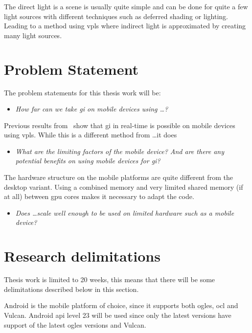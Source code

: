 \documentclass[a4paper, 12pt]{article}
\begin{document}
The direct light is a scene is usually quite simple and can be done for quite a few light sources with different techniques such as deferred shading or lighting. Leading to a method using \glspl{vpl} where indirect light is approximated by creating many light sources.


\section{Problem Statement}
\label{sec:Problem Statement}

The problem statements for this thesis work will be:

\begin{itemize}
  \item \textit{How far can we take \gls{gi} on mobile devices using \ldots?}
\end{itemize}

Previous results from~\cite{gimobile} show that \gls{gi} in real-time is possible on mobile devices using \glspl{vpl}. While this is a different method from \ldots it does

\begin{itemize}
  \item \textit{What are the limiting factors of the mobile device? And are there any potential benefits on using mobile devices for \gls{gi}?}
\end{itemize}

The hardware structure on the mobile platforms are quite different from the desktop variant. Using a combined memory and very limited shared memory (if at all) between \gls{gpu} cores makes it necessary to adapt the code.

\begin{itemize}
  \item \textit{Does \ldots scale well enough to be used on limited hardware such as a mobile device?}
\end{itemize}



\section{Research delimitations}
\label{sec:Research delimitations}

Thesis work is limited to 20 weeks, this means that there will be some delimitations described below in this section.

Android is the mobile platform of choice, since it supports both \gls{ogles}, \gls{ocl} and Vulcan. Android \acrshort{api} level 23 will be used since only the latest versions have support of the latest \gls{ogles} versions and Vulcan.
\end{document}
